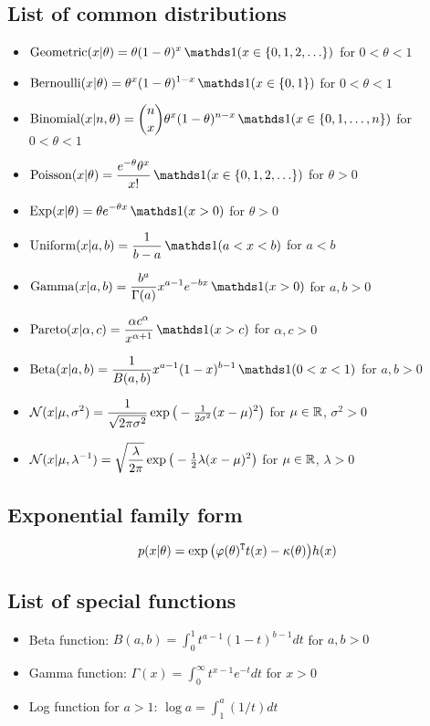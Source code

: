 \documentclass[12pt]{article}
\begin{document}
\newpage
\subsection*{List of common distributions}
\begin{itemize}
    \setlength\itemsep{1em}
    \item[] $\displaystyle \Geometric(x|\theta) = \theta(1-\theta)^x\,\I(x\in\{0,1,2,\ldots\})$ for $0<\theta<1$
    \item[] $\displaystyle \Bernoulli(x|\theta) = \theta^x(1-\theta)^{1-x}\,\I(x\in\{0,1\})$ for $0<\theta<1$
    \item[] $\displaystyle \Binomial(x|n,\theta) = {n\choose x}\theta^x(1-\theta)^{n-x}\,\I(x\in\{0,1,\ldots,n\})$ for $0<\theta<1$
    \item[] $\displaystyle \Poisson(x|\theta) = \frac{e^{-\theta}\theta^x}{x!}\,\I(x\in\{0,1,2,\ldots\})$ for $\theta>0$
    \item[] $\displaystyle \Exp(x|\theta) = \theta e^{-\theta x}\,\I(x>0)$ for $\theta>0$
    \item[] $\displaystyle \Uniform(x|a,b) = \frac{1}{b-a}\,\I(a<x<b)$ for $a<b$
    \item[] $\displaystyle \Ga(x|a,b) = \frac{b^a}{\Gamma(a)}x^{a-1}e^{-b x}\,\I(x>0)$ for $a,b>0$
    \item[] $\displaystyle \Pareto(x|\alpha,c) = \frac{\alpha c^\alpha}{x^{\alpha+1}}\,\I(x>c)$ for $\alpha,c>0$
    \item[] $\displaystyle \Beta(x|a,b) = \frac{1}{B(a,b)}x^{a-1}(1-x)^{b-1}\,\I(0<x<1)$ for $a,b>0$
    \item[] $\displaystyle \mathcal{N}(x|\mu,\sigma^2) = \frac{1}{\sqrt{2\pi\sigma^2}}\exp\big(-\tfrac{1}{2\sigma^2}(x-\mu)^2\big)$
        for $\mu\in\mathbb{R}$, $\sigma^2>0$
    \item[] $\displaystyle \mathcal{N}(x|\mu,\lambda^{-1}) = \sqrt{\frac{\lambda}{2\pi}}\exp\big(-\tfrac{1}{2}\lambda(x-\mu)^2\big)$
        for $\mu\in\mathbb{R}$, $\lambda>0$
\end{itemize}

\subsection*{Exponential family form}
$$ p(x|\theta) =\exp\big(\varphi(\theta)^{\mathtt{T}} t(x)-\kappa(\theta)\big) h(x) $$

\subsection*{List of special functions}
\label{special-functions}
\begin{itemize}
    \setlength\itemsep{1em}
    \item[] Beta function: $\displaystyle B(a,b) = \int_0^1 t^{a-1}(1-t)^{b-1} d t$ for $a,b>0$
    \item[] Gamma function: $\displaystyle \Gamma(x) = \int_0^\infty t^{x-1} e^{-t} d t$ for $x>0$
    \item[] Log function for $a>1$: $\displaystyle \log a = \int_1^a (1/t) d t$
\end{itemize}
\end{document}
